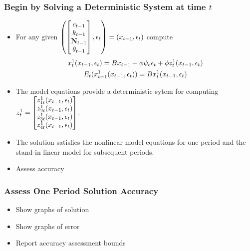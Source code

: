 \documentclass[letter]{beamer}
\begin{document}
\begin{frame}
  \frametitle{Begin by Solving a Deterministic System at time $t$}
{\small

  \begin{itemize}
  \item For any given $\left (  \begin{bmatrix}
c_{t-1}\\k_{t-1}\\ {\mathbf{N}}_{t-1}\\\theta_{t-1}
  \end{bmatrix}, \epsilon_t \right )=(x_{t-1},\epsilon_t)$ 
compute
  \begin{gather}
    \label{eq:3}
    x_t^1(x_{t-1},\epsilon_t)=B x_{t-1} + \phi \psi_e\epsilon_t + \phi z^1_t(x_{t-1},\epsilon_t)\\
    E_t(x^1_{t+1}(x_{t-1},\epsilon_t))=B x^1_{t}(x_{t-1},\epsilon_t)
  \end{gather}
\item The model equations provide a deterministic sytem  for computing $  z^1_t=\begin{bmatrix}
    z^1_{1t}(x_{t-1},\epsilon_t)\\
    z^1_{2t}(x_{t-1},\epsilon_t)\\
    z^1_{3t}(x_{t-1},\epsilon_t)\\
    z^1_{4t}(x_{t-1},\epsilon_t)
  \end{bmatrix}$.
\item The solution satisfies the nonlinear model equations for one 
period and the stand-in linear model for subsequent periods.
\item Assess accuracy
  \end{itemize}
}

\end{frame}

\begin{frame}
  \frametitle{Assess One Period Solution Accuracy}
  \begin{itemize}
  \item Show graphs of solution
  \item Show graphs of error
  \item Report accuracy assessment bounds
  \end{itemize}
\end{frame}
\end{document}
